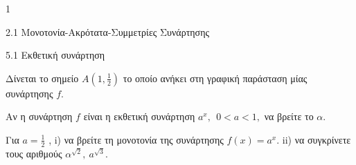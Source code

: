 \begin{ylh}{1}
\item 2.1 Μονοτονία-Ακρότατα-Συμμετρίες Συνάρτησης
\item 5.1 Εκθετική συνάρτηση
\end{ylh}
Δίνεται το σημείο $Α\left( 1,\frac{1}{2} \right)$ το οποίο ανήκει στη γραφική παράσταση μίας συνάρτησης $f.$
\begin{alist}
\item Αν η συνάρτηση $f$ είναι η εκθετική συνάρτηση $a^{x},\ \ 0 < a < 1,$ να βρείτε το $\alpha.$
\item Για $a = \frac{1}{2}$ ,
i) να βρείτε τη μονοτονία της συνάρτησης $f(x) = a^{x}.$
ii) να συγκρίνετε τους αριθμούς $\alpha^{\sqrt{2}},{\ a}^{\sqrt{3}}.$
\end{alist}


